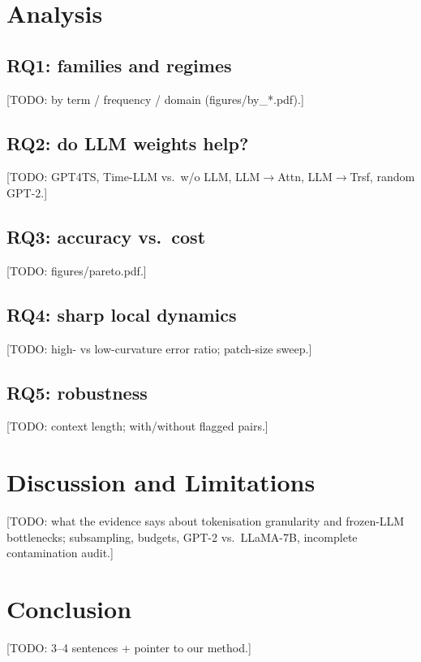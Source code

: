 \documentclass[11pt]{article}
\newcommand{\todo}[1]{{\color{red}[TODO: #1]}}
\begin{document}
\section{Analysis}
\subsection{RQ1: families and regimes} \todo{by term / frequency / domain (figures/by\_*.pdf).}
\subsection{RQ2: do LLM weights help?} \todo{GPT4TS, Time-LLM vs.\ w/o LLM, LLM$\rightarrow$Attn, LLM$\rightarrow$Trsf, random GPT-2.}
\subsection{RQ3: accuracy vs.\ cost} \todo{figures/pareto.pdf.}
\subsection{RQ4: sharp local dynamics} \todo{high- vs low-curvature error ratio; patch-size sweep.}
\subsection{RQ5: robustness} \todo{context length; with/without flagged pairs.}

\section{Discussion and Limitations}
\todo{what the evidence says about tokenisation granularity and frozen-LLM bottlenecks; subsampling, budgets, GPT-2 vs.\ LLaMA-7B, incomplete contamination audit.}

\section{Conclusion} \todo{3--4 sentences + pointer to our method.}


\end{document}
